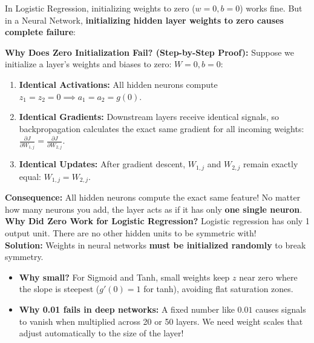 \documentclass[10pt,a4paper]{article}
\begin{document}
\vspace{-6pt}

\par
In Logistic Regression, initializing weights to zero ($w = 0, b = 0$) works fine. But in a Neural Network, \textbf{initializing hidden layer weights to zero causes complete failure}:

\begin{tcolorbox}[
    colframe=accentred, colback=white, arc=1.3mm, boxrule=0.5pt,
    left=5pt, right=5pt, top=2pt, bottom=2pt
]
\footnotesize
\textbf{Why Does Zero Initialization Fail? (Step-by-Step Proof):}
Suppose we initialize a layer's weights and biases to zero: $W = 0, b = 0$:
\begin{enumerate}[leftmargin=12pt, itemsep=1pt, topsep=0pt]
    \item \textbf{Identical Activations:} All hidden neurons compute $z_1 = z_2 = 0 \implies a_1 = a_2 = g(0)$.
    \item \textbf{Identical Gradients:} Downstream layers receive identical signals, so backpropagation calculates the exact same gradient for all incoming weights: $\frac{\partial J}{\partial W_{1, j}} = \frac{\partial J}{\partial W_{2, j}}$.
    \item \textbf{Identical Updates:} After gradient descent, $W_{1, j}$ and $W_{2, j}$ remain exactly equal: $W_{1, j} = W_{2, j}$.
\end{enumerate}
\textbf{Consequence:} All hidden neurons compute the exact same feature! No matter how many neurons you add, the layer acts as if it has only \textbf{one single neuron}.
\\[1pt]
\textbf{Why Did Zero Work for Logistic Regression?} Logistic regression has only 1 output unit. There are no other hidden units to be symmetric with!
\\[1pt]
\textbf{Solution:} Weights in neural networks \textbf{must be initialized randomly} to break symmetry.
\end{tcolorbox}

\vspace{-2pt}

\par
\begin{itemize}[leftmargin=10pt, itemsep=0.5pt, topsep=0.5pt]
    \item \textbf{Why small?} For Sigmoid and Tanh, small weights keep $z$ near zero where the slope is steepest ($g'(0) = 1$ for tanh), avoiding flat saturation zones.
    \item \textbf{Why 0.01 fails in deep networks:} A fixed number like $0.01$ causes signals to vanish when multiplied across 20 or 50 layers. We need weight scales that adjust automatically to the size of the layer!
\end{itemize}
\end{document}
